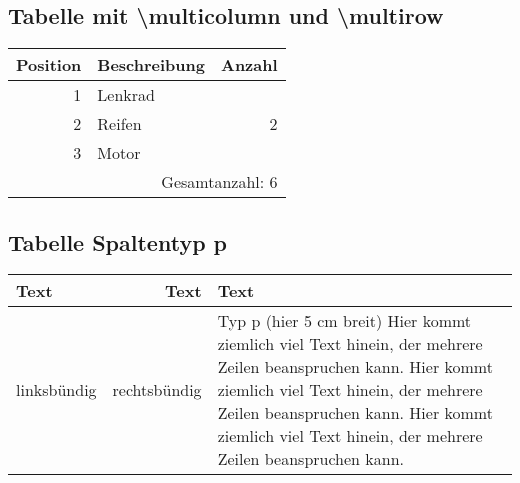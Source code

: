 \subsection{Tabelle mit \textbackslash multicolumn und \textbackslash multirow}%
%
\begin{table}[h]
\begin{center}
\begin{tabular}{rlr}
   \hline
   Position & Beschreibung & Anzahl \\
   \hline
          1 & Lenkrad      &      \multirow{3}{*}{2} \\ %
          2 & Reifen\\
          3 & Motor\\
  \hline
  \multicolumn{3}{r}{Gesamtanzahl: 6} \\
  \hline
\end{tabular}
\end{center}
\label{tab:2}
\end{table}
%
%
%
%
\subsection{Tabelle Spaltentyp p}%
%
\begin{table}[h]
\begin{center}
\begin{tabular}{lrp{5cm}}
   \hline
   \textbf{Text} & \textbf{Text} & \textbf{Text} \\
   \hline
   linksbündig & 
   rechtsbündig & 
   Typ p (hier 5 cm breit) Hier kommt ziemlich viel Text hinein, der mehrere Zeilen beanspruchen kann. Hier kommt ziemlich viel Text hinein, der mehrere Zeilen beanspruchen kann. Hier kommt ziemlich viel Text hinein, der mehrere Zeilen beanspruchen kann.  \\
  \hline
\end{tabular}
\end{center}
\label{tab:3}
\end{table}
%
%
%
\newpage%
